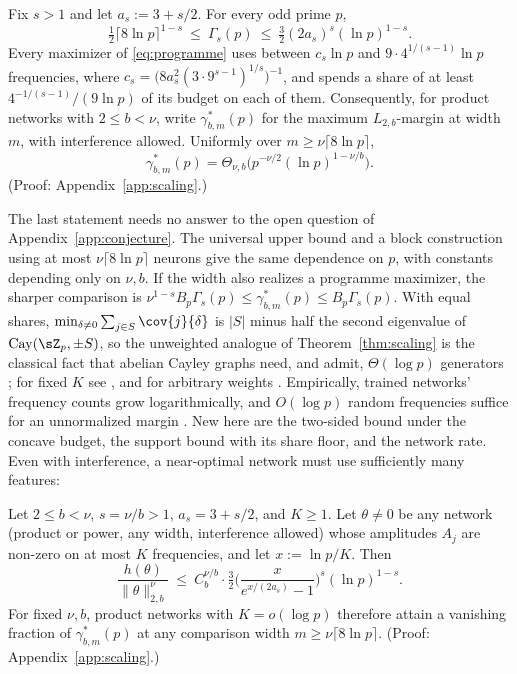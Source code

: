 \begin{theorem}\label{thm:scaling}
Fix $s>1$ and let $a_s:=3+s/2$. For every odd prime $p$,
\[
\tfrac12\lceil8\ln p\rceil^{1-s}\ \le\ \Gamma_s(p)\ \le\ \tfrac32(2a_s)^s(\ln p)^{1-s}.
\]
Every maximizer of \eqref{eq:programme} uses between $c_s\ln p$ and $9\cdot4^{1/(s-1)}\ln p$ frequencies, where $c_s=\big(8a_s^2(3\cdot9^{s-1})^{1/s}\big)^{-1}$, and spends a share of at least $4^{-1/(s-1)}/(9\ln p)$ of its budget on each of them. Consequently, for product networks with $2\le b<\nu$, write $\gamma^*_{b,m}(p)$ for the maximum $L_{2,b}$-margin at width $m$, with interference allowed. Uniformly over $m\ge\nu\lceil8\ln p\rceil$,
\[
\gamma^*_{b,m}(p)=\Theta_{\nu,b}\big(p^{-\nu/2}(\ln p)^{1-\nu/b}\big).
\]
(Proof: Appendix~\ref{app:scaling}.)
\end{theorem}

The last statement needs no answer to the open question of Appendix~\ref{app:conjecture}. The universal upper bound and a block construction using at most $\nu\lceil8\ln p\rceil$ neurons give the same dependence on $p$, with constants depending only on $\nu,b$. If the width also realizes a programme maximizer, the sharper comparison is $\nu^{1-s}B_p\Gamma_s(p)\le\gamma^*_{b,m}(p)\le B_p\Gamma_s(p)$. With equal shares, $\min_{\delta\ne0}\sum_{j\in S}\cov{j}{\delta}$ is $|S|$ minus half the second eigenvalue of $\mathrm{Cay}(\sZ_p,\pm S)$, so the unweighted analogue of Theorem~\ref{thm:scaling} is the classical fact that abelian Cayley graphs need, and admit, $\Theta(\log p)$ generators \citep[Sec.~3]{alon1994random}; for fixed $K$ see \citet{friedman2006spectral}, and for arbitrary weights \citet{wang2025positive}. Empirically, trained networks' frequency counts grow logarithmically, and $O(\log p)$ random frequencies suffice for an unnormalized margin \citep{mccracken2025}. New here are the two-sided bound under the concave budget, the support bound with its share floor, and the network rate. Even with interference, a near-optimal network must use sufficiently many features:

\begin{corollary}\label{cor:few}
Let $2\le b<\nu$, $s=\nu/b>1$, $a_s=3+s/2$, and $K\ge1$. Let $\theta\neq0$ be any network (product or power, any width, interference allowed) whose amplitudes $A_j$ are non-zero on at most $K$ frequencies, and let $x:=\ln p/K$. Then
\[
\frac{h(\theta)}{\|\theta\|_{2,b}^\nu}\ \le\ C_b^{\nu/b}\cdot\tfrac32\Big(\frac{x}{e^{x/(2a_s)}-1}\Big)^{s}(\ln p)^{1-s}.
\]
For fixed $\nu,b$, product networks with $K=o(\log p)$ therefore attain a vanishing fraction of $\gamma^*_{b,m}(p)$ at any comparison width $m\ge\nu\lceil8\ln p\rceil$. (Proof: Appendix~\ref{app:scaling}.)
\end{corollary}

